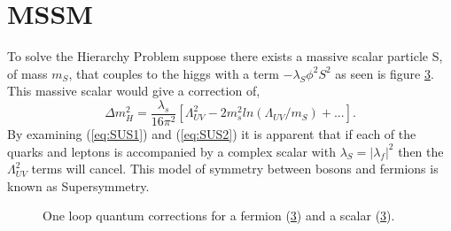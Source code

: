 \section{MSSM}
To solve the Hierarchy Problem suppose there exists a massive scalar particle S, 
of mass $m_{S}$, that couples
to the higgs with a term $-\lambda_{S}\phi^{2} S^{2}$ as seen is 
figure \ref{fig:scalarLoop}. This massive scalar would give a correction of,
\begin{equation}
\Delta m_{H}^{2}=\frac{\lambda_{s}}{16\pi^{2}}\left[\Lambda_{UV}^{2}-2m_{s}^{2}ln(\Lambda_{UV}/m_{S})+... \right].
\label{eq:SUS2}
\end{equation}
By examining (\ref{eq:SUS1}) and (\ref{eq:SUS2}) it is apparent that if each of the quarks
and leptons is accompanied by a complex scalar with $\lambda_{S}=|\lambda_{f}|^{2}$  %
then the $\Lambda_{UV}^{2}$ terms will cancel. This model of symmetry between bosons
and fermions is known as Supersymmetry.

\begin{figure}[hb]
  \centering
  \begin{subfigure}[trim = 0mm 0mm 0mm 0mm, clip, width=3cm]{.4\textwidth}
                \caption{}
                \label{fig:fermionLoop}
\end{subfigure}
\begin{subfigure}[trim = 0mm 0mm 0mm 0mm, clip, width=3cm]{.4\textwidth}
	\caption{}
                \label{fig:scalarLoop}
                	
  \end{subfigure}
   \caption[]{One loop quantum corrections for a fermion (\ref{fig:scalarLoop}) and a scalar (\ref{fig:scalarLoop}). }
\end{figure}

